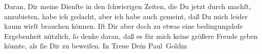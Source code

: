            \pstart
           Daran, Dir meine Dienſte in den ſchwierigen Zeiten, die Du jetzt durch machſt,
               anzubieten, habe ich \strikeout{\textcolor{gray}{×}} gedacht, aber ich habe  auch gemeint, daß
               Du mich leider kaum wirſt brauchen können. Iſt Dir aber doch zu etwas eine
               bedingungsloſe Ergebenheit nützlich, ſo denke daran, daß es für mich keine größere
               Freude geben könnte, als ſie Dir zu beweiſen.\pend
           \pstart In Treue Dein \spacefill\mbox{Paul Goldm}\pend{}\endnumbering{}\begin{anhang}\end{anhang}
      
